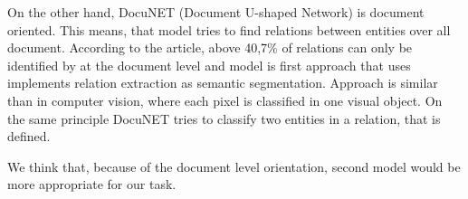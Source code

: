 \documentclass[fleqn,moreauthors,10pt]{ds_report}
\begin{document}
On the other hand, DocuNET (Document U-shaped Network) is document oriented. This means, that model tries to find relations between entities over all document. According to the article\cite{ijcai2021-551}, above 40,7\% of relations can only be identified by at the document level and model is first approach that uses implements relation extraction as semantic segmentation. Approach is similar than in computer vision, where each pixel is classified in one visual object. On the same principle DocuNET tries to classify two entities in a relation, that is defined.

We think that, because of the document level orientation, second model would be more appropriate for our task.










\end{document}
